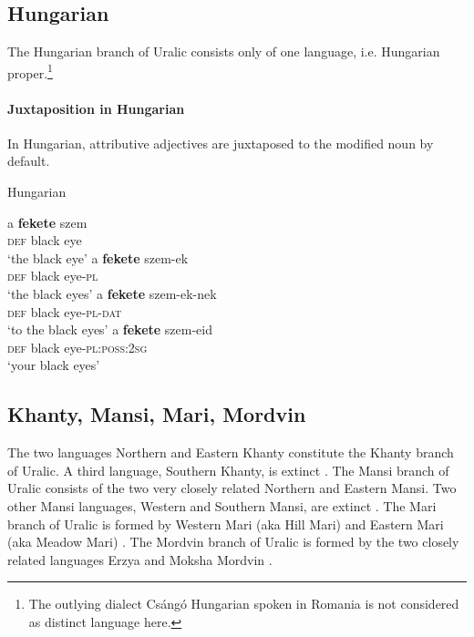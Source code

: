 \subsection{Hungarian}
The Hungarian branch of Uralic consists only of one language, i.e. Hungarian proper.\footnote{The outlying dialect Csángó Hungarian spoken in Romania is not considered as distinct language here.}

\paragraph*{Juxtaposition in Hungarian}
In Hungarian, attributive adjectives are juxtaposed to the modified noun by default.
\begin{exe}
\label{hung juxt}
\ex \rm{Hungarian \citep[41]{hall1938}}
\begin{xlist}
\ex 
\gll	a \textbf{fekete} szem\\
	\textsc{def} black eye\\
\glt	‘the black eye’
\ex	
\gll	a \textbf{fekete} szem-ek\\
	\textsc{def} black eye-\textsc{pl}\\
\glt	‘the black eyes’
\ex
\gll	a \textbf{fekete} szem-ek-nek\\
	\textsc{def} black eye-\textsc{pl}-\textsc{dat}\\
\glt	‘to the black eyes’
\ex
\gll	a \textbf{fekete} szem-eid\\
	\textsc{def} black eye-\textsc{pl:poss:2sg}\\
\glt	‘your black eyes’
\end{xlist}
\end{exe}

\subsection{Khanty, Mansi, Mari, Mordvin}
The two languages Northern and Eastern Khanty constitute the Khanty branch of Uralic. A third language, Southern Khanty, is extinct \citep[231]{salminen2007}. The Mansi branch of Uralic consists of the two very closely related Northern and Eastern Mansi. Two other Mansi languages, Western and Southern Mansi, are extinct \citep[231]{salminen2007}. The Mari branch of Uralic is formed by Western Mari (aka Hill Mari) and Eastern Mari (aka Meadow Mari) \citep[231]{salminen2007}. The Mordvin branch of Uralic is formed by the two closely related languages Erzya and Moksha Mordvin \citep[231]{salminen2007}.

